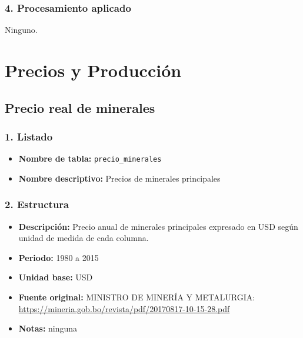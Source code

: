 \documentclass[12pt,a4paper]{article}
\begin{document}
\subsubsection*{4. Procesamiento aplicado}
Ninguno.


\section{Precios y Producción}

\subsection{Precio real de minerales}

\subsubsection*{1. Listado}
\begin{itemize}
  \item \textbf{Nombre de tabla:} \texttt{precio\_minerales}
  \item \textbf{Nombre descriptivo:} Precios de minerales principales
\end{itemize}

\subsubsection*{2. Estructura}
\begin{itemize}
  \item \textbf{Descripción:} Precio anual de minerales principales expresado en USD según unidad de medida de cada columna.
  \item \textbf{Periodo:} 1980 a 2015
  \item \textbf{Unidad base:} USD
  \item \textbf{Fuente original:} MINISTRO DE MINERÍA Y METALURGIA:\\
    \url{https://mineria.gob.bo/revista/pdf/20170817-10-15-28.pdf}
  \item \textbf{Notas:} ninguna
\end{itemize}
\end{document}
